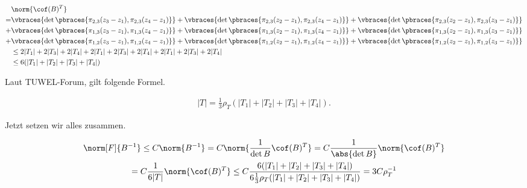 \begin{solution}
\begin{align*}
  & \norm{\cof(B)^T} \\
  =
  & \vbraces
  {
    \det
    \pbraces
    {
      \pi_{2, 3}(z_3 - z_1),
      \pi_{2, 3}(z_4 - z_1)
    }
  }
  +
  \vbraces
  {
    \det
    \pbraces
    {
      \pi_{2, 3}(z_2 - z_1),
      \pi_{2, 3}(z_4 - z_1)
    }
  }
  +
  \vbraces
  {
    \det
    \pbraces
    {
      \pi_{2, 3}(z_2 - z_1),
      \pi_{2, 3}(z_3 - z_1)
    }
  } \\
  +
  & \vbraces
  {
    \det
    \pbraces
    {
      \pi_{1, 3}(z_3 - z_1),
      \pi_{1, 3}(z_4 - z_1)
    }
  }
  +
  \vbraces
  {
    \det
    \pbraces
    {
      \pi_{1, 3}(z_2 - z_1),
      \pi_{1, 3}(z_4 - z_1)
    }
  }
  +
  \vbraces
  {
    \det
    \pbraces
    {
      \pi_{1, 3}(z_2 - z_1),
      \pi_{1, 3}(z_3 - z_1)
    }
  } \\
  +
  & \vbraces
  {
    \det
    \pbraces
    {
      \pi_{1, 2}(z_3 - z_1),
      \pi_{1, 2}(z_4 - z_1)
    }
  }
  +
  \vbraces
  {
    \det
    \pbraces
    {
      \pi_{1, 2}(z_2 - z_1),
      \pi_{1, 2}(z_4 - z_1)
    }
  }
  +
  \vbraces
  {
    \det
    \pbraces
    {
      \pi_{1, 2}(z_2 - z_1),
      \pi_{1, 2}(z_3 - z_1)
    }
  } \\
  & \leq
  2 |T_1| + 2 |T_3| + 2 |T_4| +
  2 |T_1| + 2 |T_3| + 2 |T_4| +
  2 |T_1| + 2 |T_3| + 2 |T_4| \\
  & \leq
  6 (|T_1| + |T_2| + |T_3| + |T_4|)
\end{align*}

Laut TUWEL-Forum, gilt folgende Formel.

\begin{align*}
  |T|
  =
  \frac{1}{3} \rho_T (|T_1| + |T_2| + |T_3| + |T_4|).
\end{align*}

Jetzt setzen wir alles zusammen.

\begin{multline*}
  \norm[F]{B^{-1}}
  \leq
  C \norm{B^{-1}}
  =
  C
  \norm
  {
    \frac{1}{\det B}
    \cof(B)^T
  }
  =
  C
  \frac{1}{\abs{\det B}}
  \norm{\cof(B)^T} \\
  =
  C
  \frac{1}{6 |T|}
  \norm{\cof(B)^T}
  \leq
  C
  \frac
  {
    6 (|T_1| + |T_2| + |T_3| + |T_4|)
  }{
    6 \frac{1}{3} \rho_T (|T_1| + |T_2| + |T_3| + |T_4|)
  }
  =
  3 C \rho_T^{-1}
\end{multline*}

\end{solution}

